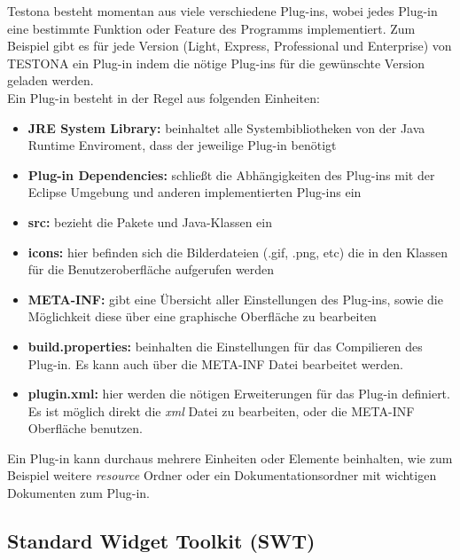 Testona besteht momentan aus viele verschiedene Plug-ins, wobei jedes Plug-in eine bestimmte Funktion oder Feature des Programms implementiert. Zum Beispiel gibt es für jede Version (Light, Express, Professional und Enterprise) von TESTONA ein Plug-in indem die nötige Plug-ins für die gewünschte Version geladen werden.\\

Ein Plug-in besteht in der Regel aus folgenden Einheiten:

\begin{itemize}
\item \textbf{JRE System Library:} beinhaltet alle Systembibliotheken von der Java Runtime Enviroment, dass der jeweilige Plug-in benötigt
\item \textbf{Plug-in Dependencies:} schließt die Abhängigkeiten des Plug-ins mit der Eclipse Umgebung und anderen implementierten Plug-ins ein
\item \textbf{src:} bezieht die Pakete und Java-Klassen ein
\item \textbf{icons:} hier befinden sich die Bilderdateien (.gif, .png, etc) die in den Klassen für die Benutzeroberfläche  aufgerufen werden
\item \textbf{META-INF:} gibt eine Übersicht aller Einstellungen des Plug-ins, sowie die Möglichkeit diese über eine graphische Oberfläche zu bearbeiten
\item \textbf{build.properties:} beinhalten die Einstellungen für das Compilieren des Plug-in. Es kann auch über die META-INF Datei bearbeitet werden.
\item \textbf{plugin.xml:} hier werden die nötigen Erweiterungen für das Plug-in definiert. Es ist möglich direkt die \textit{xml} Datei zu bearbeiten, oder die META-INF Oberfläche benutzen.
\end{itemize}

Ein Plug-in kann durchaus mehrere Einheiten oder Elemente beinhalten, wie zum Beispiel weitere \textit{resource} Ordner oder ein Dokumentationsordner mit wichtigen Dokumenten zum Plug-in.




\subsection{Standard Widget Toolkit (SWT)}
